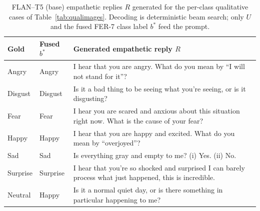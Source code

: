 \documentclass[sigconf,nonacm]{acmart}
\begin{document}
  \begin{table}[t]
    \small
    \centering
    \caption{FLAN--T5 (base) empathetic replies $R$ generated for the per-class qualitative cases of Table~\ref{tab:qualimages}. Decoding is deterministic beam search; only $U$ and the fused FER-7 class label $b^{*}$ feed the prompt.}
    \label{tab:qualresponses}
    \setlength{\tabcolsep}{4pt}
    \renewcommand{\arraystretch}{1.2}
    \begin{tabular}{@{}l l p{}@{}}
      \toprule
      \textbf{Gold} & \textbf{Fused $b^{*}$} & \textbf{Generated empathetic reply $R$} \\
      \midrule
      Angry    & Angry    & I hear that you are angry. What do you mean by ``I will not stand for it''? \\
      Disgust  & Disgust  & Is it a bad thing to be seeing what you're seeing, or is it disgusting? \\
      Fear     & Fear     & I hear you are scared and anxious about this situation right now. What is the cause of your fear? \\
      Happy    & Happy    & I hear that you are happy and excited. What do you mean by ``overjoyed''? \\
      Sad      & Sad      & Is everything gray and empty to me? (i) Yes. (ii) No. \\
      Surprise & Surprise & I hear that you're so shocked and surprised I can barely process what just happened, this is incredible. \\
      Neutral  & Happy    & Is it a normal quiet day, or is there something in particular happening to me? \\
      \bottomrule
    \end{tabular}
  \end{table}
\end{document}
